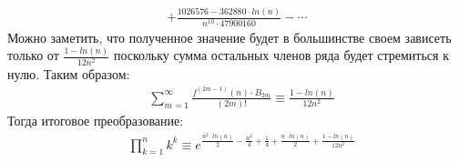 \documentclass[a4paper,12pt,numbers=noenddot]{scrreprt}
\begin{document}
\begin{flushleft}
\begin{align}
    + \frac{1026576-362880 \cdot ln(n)}{n^{10} \cdot 47900160} - \cdots
    \end{align}
    Можно заметить, что полученное значение будет в большинстве своем зависеть только от $\frac{1-ln(n)}{12n^2}$ поскольку сумма остальных членов ряда будет стремиться к нулю. Таким образом: 
    \begin{align}
    & \sum_{m=1}^\infty \frac{f^{(2m-1)}(n) \cdot B_{2m}}{(2m)!} \equiv \frac{1-ln(n)}{12n^2}
    \end{align}
    Тогда итоговое преобразование:
    \begin{align}   
    & \prod_{k=1}^{n} k^k \equiv e^{\frac{n^2 \cdot ln(n)}{2}-\frac{n^2}{4}+\frac{1}{4} + \frac{n \cdot ln(n)}{2}+\frac{1-ln(n)}{12n^2}}
    \end{align}
\end{flushleft}
\end{document}
